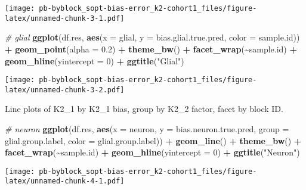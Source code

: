 \documentclass[
]{article}
\newenvironment{Shaded}{\begin{snugshade}}{\end{snugshade}}
\newcommand{\AttributeTok}[1]{\textcolor[rgb]{0.13,0.29,0.53}{#1}}
\newcommand{\CommentTok}[1]{\textcolor[rgb]{0.56,0.35,0.01}{\textit{#1}}}
\newcommand{\DecValTok}[1]{\textcolor[rgb]{0.00,0.00,0.81}{#1}}
\newcommand{\FloatTok}[1]{\textcolor[rgb]{0.00,0.00,0.81}{#1}}
\newcommand{\FunctionTok}[1]{\textcolor[rgb]{0.13,0.29,0.53}{\textbf{#1}}}
\newcommand{\NormalTok}[1]{#1}
\newcommand{\SpecialCharTok}[1]{\textcolor[rgb]{0.81,0.36,0.00}{\textbf{#1}}}
\newcommand{\StringTok}[1]{\textcolor[rgb]{0.31,0.60,0.02}{#1}}
\begin{document}
\texttt{[image: pb-byblock\_sopt-bias-error\_k2-cohort1\_files/figure-latex/unnamed-chunk-3-1.pdf]}

\begin{Shaded}
\begin{Highlighting}[]
\CommentTok{\# glial}
\FunctionTok{ggplot}\NormalTok{(df.res, }\FunctionTok{aes}\NormalTok{(}\AttributeTok{x =}\NormalTok{ glial, }\AttributeTok{y =}\NormalTok{ bias.glial.true.pred, }\AttributeTok{color =}\NormalTok{ sample.id)) }\SpecialCharTok{+} 
  \FunctionTok{geom\_point}\NormalTok{(}\AttributeTok{alpha =} \FloatTok{0.2}\NormalTok{) }\SpecialCharTok{+} \FunctionTok{theme\_bw}\NormalTok{() }\SpecialCharTok{+} \FunctionTok{facet\_wrap}\NormalTok{(}\SpecialCharTok{\textasciitilde{}}\NormalTok{sample.id) }\SpecialCharTok{+} \FunctionTok{geom\_hline}\NormalTok{(}\AttributeTok{yintercept =} \DecValTok{0}\NormalTok{) }\SpecialCharTok{+}
  \FunctionTok{ggtitle}\NormalTok{(}\StringTok{"Glial"}\NormalTok{)}
\end{Highlighting}
\end{Shaded}

\texttt{[image: pb-byblock\_sopt-bias-error\_k2-cohort1\_files/figure-latex/unnamed-chunk-3-2.pdf]}

Line plots of K2\_1 by K2\_1 bias, group by K2\_2 factor, facet by block
ID.

\begin{Shaded}
\begin{Highlighting}[]
\CommentTok{\# neuron}
\FunctionTok{ggplot}\NormalTok{(df.res, }\FunctionTok{aes}\NormalTok{(}\AttributeTok{x =}\NormalTok{ neuron, }\AttributeTok{y =}\NormalTok{ bias.neuron.true.pred, }
                   \AttributeTok{group =}\NormalTok{ glial.group.label, }\AttributeTok{color =}\NormalTok{ glial.group.label)) }\SpecialCharTok{+} 
  \FunctionTok{geom\_line}\NormalTok{() }\SpecialCharTok{+} \FunctionTok{theme\_bw}\NormalTok{() }\SpecialCharTok{+} \FunctionTok{facet\_wrap}\NormalTok{(}\SpecialCharTok{\textasciitilde{}}\NormalTok{sample.id) }\SpecialCharTok{+} \FunctionTok{geom\_hline}\NormalTok{(}\AttributeTok{yintercept =} \DecValTok{0}\NormalTok{) }\SpecialCharTok{+}
  \FunctionTok{ggtitle}\NormalTok{(}\StringTok{"Neuron"}\NormalTok{)}
\end{Highlighting}
\end{Shaded}

\texttt{[image: pb-byblock\_sopt-bias-error\_k2-cohort1\_files/figure-latex/unnamed-chunk-4-1.pdf]}
\end{document}
